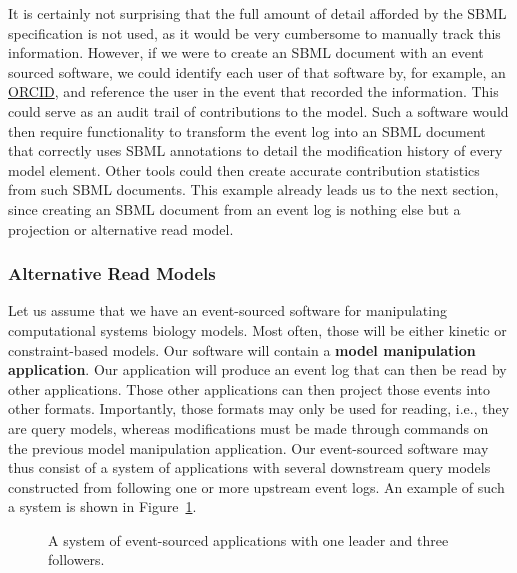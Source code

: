\documentclass[
  a4paper,
]{scrartcl}
\makeatletter
\newcommand*\pandocbounded[1]{%
  \sbox\pandoc@box{#1}%
  \Gscale@div\@tempa{\textheight}{\dimexpr\ht\pandoc@box+\dp\pandoc@box\relax}%
  \Gscale@div\@tempb{\linewidth}{\wd\pandoc@box}%
  \ifdim\@tempb\p@<\@tempa\p@\let\@tempa\@tempb\fi%
  \ifdim\@tempa\p@<\p@\scalebox{\@tempa}{\usebox\pandoc@box}%
  \else\usebox{\pandoc@box}%
  \fi%
}
\makeatother
\begin{document}
It is certainly not surprising that the full amount of detail afforded
by the SBML specification is not used, as it would be very cumbersome to
manually track this information. However, if we were to create an SBML
document with an event sourced software, we could identify each user of
that software by, for example, an \href{https://orcid.org/}{ORCID}, and
reference the user in the event that recorded the information. This
could serve as an audit trail of contributions to the model. Such a
software would then require functionality to transform the event log
into an SBML document that correctly uses SBML annotations to detail the
modification history of every model element. Other tools could then
create accurate contribution statistics from such SBML documents. This
example already leads us to the next section, since creating an SBML
document from an event log is nothing else but a projection or
alternative read model.

\subsubsection{Alternative Read Models}\label{alternative-read-models}

Let us assume that we have an event-sourced software for manipulating
computational systems biology models. Most often, those will be either
kinetic or constraint-based models. Our software will contain a
\textbf{model manipulation application}. Our application will produce an
event log that can then be read by other applications. Those other
applications can then project those events into other formats.
Importantly, those formats may only be used for reading, i.e., they are
query models, whereas modifications must be made through commands on the
previous model manipulation application. Our event-sourced software may
thus consist of a system of applications with several downstream query
models constructed from following one or more upstream event logs. An
example of such a system is shown in
Figure~\ref{fig-alternative-models}.

\begin{figure}

\centering{

\pandocbounded{\texttt{[image: alternative-models.pdf]}}

}

\caption{\label{fig-alternative-models}A system of event-sourced
applications with one leader and three followers.}

\end{figure}%
\end{document}
